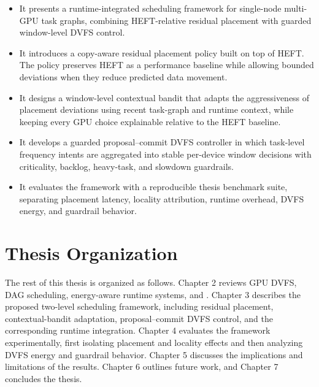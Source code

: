\begin{itemize}
    \item It presents a runtime-integrated scheduling framework for single-node multi-GPU \CUDASTF{} task graphs, combining HEFT-relative residual placement with guarded window-level DVFS control.
    \item It introduces a copy-aware residual placement policy built on top of HEFT. The policy preserves HEFT as a performance baseline while allowing bounded deviations when they reduce predicted data movement.
    \item It designs a window-level contextual bandit that adapts the aggressiveness of placement deviations using recent task-graph and runtime context, while keeping every GPU choice explainable relative to the HEFT baseline.
    \item It develops a guarded proposal--commit DVFS controller in which task-level frequency intents are aggregated into stable per-device window decisions with criticality, backlog, heavy-task, and slowdown guardrails.
    \item It evaluates the framework with a reproducible \CUDASTF{} thesis benchmark suite, separating placement latency, locality attribution, runtime overhead, DVFS energy, and guardrail behavior.
\end{itemize}

\section{Thesis Organization}

The rest of this thesis is organized as follows. Chapter 2 reviews GPU DVFS, DAG scheduling, energy-aware runtime systems, and \CUDASTF{}. Chapter 3 describes the proposed two-level scheduling framework, including residual placement, contextual-bandit adaptation, proposal--commit DVFS control, and the corresponding \CUDASTF{} runtime integration. Chapter 4 evaluates the framework experimentally, first isolating placement and locality effects and then analyzing DVFS energy and guardrail behavior. Chapter 5 discusses the implications and limitations of the results. Chapter 6 outlines future work, and Chapter 7 concludes the thesis.
